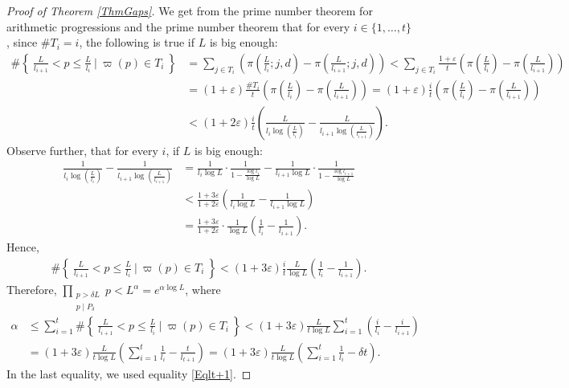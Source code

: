 \documentclass[a4paper]{amsart}
\newcommand{\1}{\mathbbm{1}}
\begin{document}
\begin{proof}[Proof of Theorem \ref{ThmGaps}]
We get from the prime number theorem for arithmetic progressions and the prime number theorem that for every $i\in\{1,\ldots ,t\}$, since $\# T_{i}= i$, the following is true if $L$ is big enough:
\begin{align*}
\#\left\{\ \frac{L}{l_{i+1}}<p\leq\frac{L}{l_{i}}\ \bigg|\ \varpi (p)\in T_{i} \ \right\} & = \sum_{j\in T_{i}} \left(\pi\left(\frac{L}{l_{i}};j,d\right) - \pi\left(\frac{L}{l_{i+1}};j,d\right) \right) < \sum_{j\in T_{i}}\frac{1+\varepsilon}{t}\left(\pi\left(\frac{L}{l_{i}}\right)-\pi\left(\frac{L}{l_{i+1}}\right)\right) \\
&= (1+\varepsilon) \frac{\# T_{i}}{t}\left(\pi\left(\frac{L}{l_{i}}\right)-\pi\left(\frac{L}{l_{i+1}}\right)\right) = (1+\varepsilon)\frac{i}{t}\left(\pi\left(\frac{L}{l_{i}}\right)-\pi\left(\frac{L}{l_{i+1}}\right)\right) \\
&< (1+2\varepsilon)\frac{i}{t}\left(\frac{L}{l_{i}\log\left(\frac{L}{l_{i}}\right)}-\frac{L}{l_{i+1}\log\left(\frac{L}{l_{i+1}}\right)}\right).
\end{align*}
Observe further, that for every $i$, if $L$ is big enough:
\begin{align*}
\frac{1}{l_{i}\log\left(\frac{L}{l_{i}}\right)}-\frac{1}{l_{i+1}\log\left(\frac{L}{l_{i+1}}\right)} & = \frac{1}{l_{i}\log L}\cdot \frac{1}{1-\frac{\log l_{i}}{\log L}} - \frac{1}{l_{i+1}\log L}\cdot \frac{1}{1-\frac{\log l_{i+1}}{\log L}} \\
& < \frac{1+3\varepsilon}{1+2\varepsilon}\left(\frac{1}{l_{i}\log L} - \frac{1}{l_{i+1}\log L}\right) \\
& = \frac{1+3\varepsilon}{1+2\varepsilon} \cdot \frac{1}{\log L}\left(\frac{1}{l_{i}}-\frac{1}{l_{i+1}}\right).
\end{align*}
Hence,
\begin{align*}
\#\left\{\ \frac{L}{l_{i+1}}<p\leq\frac{L}{l_{i}}\ \bigg|\ \varpi (p)\in T_{i} \ \right\} < (1+3\varepsilon)\frac{i}{t}\frac{L}{\log L}\left(\frac{1}{l_{i}}-\frac{1}{l_{i+1}}\right).
\end{align*}
Therefore, $\prod\limits_{\substack{p>\delta L \\ p\mid P_{\delta}}}p<L^{\alpha}=e^{\alpha\log L}$, where
\begin{align*}
\alpha &\leq \sum_{i=1}^{t} \#\left\{\ \frac{L}{l_{i+1}}<p\leq\frac{L}{l_{i}}\ \bigg|\ \varpi (p)\in T_{i} \ \right\} < (1+3\varepsilon )\frac{L}{t\log L} \sum_{i=1}^{t}\left(\frac{i}{l_{i}}-\frac{i}{l_{i+1}}\right) \\
&= (1+3\varepsilon)\frac{L}{t\log L}\left(\sum_{i=1}^{t}\frac{1}{l_{i}}-\frac{t}{l_{t+1}}\right) = (1+3\varepsilon)\frac{L}{t\log L}\left(\sum_{i=1}^{t}\frac{1}{l_{i}}-\delta t\right).
\end{align*}
In the last equality, we used equality \eqref{Eqlt+1}.


\end{proof}
\end{document}
